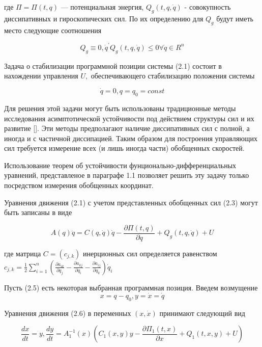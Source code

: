  где $\Pi = \Pi(t, q)$ --- потенциальная энергия, $Q_g(t, q, \dot q)$ - совокупность диссипативных и гироскопических сил. По их определению для $Q_g$ будут иметь место следующие соотношения
 
 \begin{equation}
   Q_g \equiv 0, \dot q^{'} Q_g (t, q, \dot q) \le 0 \forall \dot q \in R^n
 \end{equation}
 
Задача о стабилизации программной позиции системы (2.1) состоит в нахождении управления $U,$ обеспечивающего стабилизацию положения системы 

\begin{equation}
\dot q = 0, q = q_0 = const
\end{equation}

Для решения этой задачи могут быть использованы традиционные методы исследования асимптотической устойчивости под действием структуры сил и их развитие []. Эти методы предполагают наличие диссипативных сил с полной, а иногда и с частичной диссипацией. Таким образом для построения управляющих сил требуется измерение всех (и лишь иногда части) обобщенных скоростей. 

Использование теорем об устойчивости фунционально-дифференциальных уравнений, представленое в параграфе 1.1 позволяет решить эту задачу только посредством измерения обобщенных координат.

Уравнения движения (2.1) с учетом представленных обобщенных сил (2.3) могут быть записаны в виде 

 \begin{equation}
 A(q) \ddot q = C(q, \dot q) \dot q - \frac{\partial \Pi(t, q)}{\partial q} + Q_g(t, q, \dot q) + U
 \end{equation}

 где матрица $C = (c_{j,k})$ инерционных сил определяется равенством $c_{j,k} = \frac12 \sum_{i =1}^{n} (\frac{\partial a_{ik} } {\partial q_j} - \frac{\partial a_{kj}}{\partial q_i} - \frac{\partial a_{ij}}{\partial q_k}) \dot q_i$

Пусть (2.5) есть некоторая выбранная программная позиция. Введем возмущение
\begin{equation}
x = q - q_0, y = \dot x = \dot q
\end{equation}
 
Уравнения движения (2.6) в переменных $(x, \dot x)$ принимают следующий вид 

\begin{equation}
\frac{dx}{dt} = y, \frac{dy}{dt} = A^{-1}_1(x) (C_1(x, y) y - \frac{\partial \Pi_1 (t, x)}{\partial x} + Q_1 (t, x, y) + U)
\end{equation}

